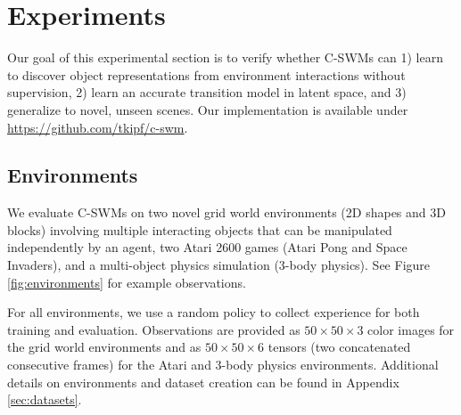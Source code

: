 \documentclass{article} %
\begin{document}
\section{Experiments}
Our goal of this experimental section is to verify whether C-SWMs can 1) learn to discover object representations from environment interactions without supervision, 2) learn an accurate transition model in latent space, and 3) generalize to novel, unseen scenes. Our implementation is available under \url{https://github.com/tkipf/c-swm}.

\subsection{Environments}
We evaluate C-SWMs on two novel grid world environments (2D shapes and 3D blocks) involving multiple interacting objects that can be manipulated independently by an agent, two Atari 2600 games (Atari Pong and Space Invaders), and a multi-object physics simulation (3-body physics). See Figure \ref{fig:environments} for example observations.

For all environments, we use a random policy to collect experience for both training and evaluation. Observations are provided as $50\times50\times3$ color images for the grid world environments and as $50\times50\times6$ tensors (two concatenated consecutive frames) for the Atari and 3-body physics environments. Additional details on environments and dataset creation can be found in Appendix \ref{sec:datasets}.
\end{document}
